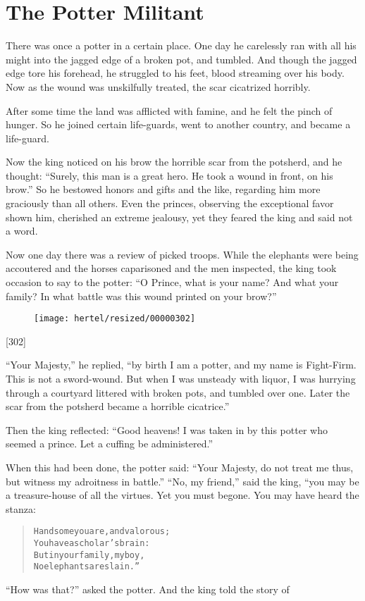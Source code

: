 \documentclass[article, twoside, 10pt]{memoir}
\renewenvironment{verbatim}{%
\begin{quote}%
\vskip -10pt%
\begin{alltt}\normalfont\small}{\end{alltt}%
\end{quote}%
\vskip -10pt
} %
\begin{document}
\chapter{The Potter Militant}

There was once a potter in a certain place. One day he carelessly
ran with all his might into the jagged edge of a broken pot, and
tumbled. And though the jagged edge tore his forehead, he struggled
to his feet, blood streaming over his body. Now as the wound was
unskilfully treated, the scar cicatrized horribly.

After some time the land was afflicted with famine, and he felt the
pinch of hunger. So he joined certain life-guards, went to another
country, and became a life-guard.

Now the king noticed on his brow the horrible scar from the
potsherd, and he thought:
``Surely, this man is a great hero. He took a wound in front, on his brow.''
So he bestowed honors and gifts and the like, regarding him more
graciously than all others. Even the princes, observing the
exceptional favor shown him, cherished an extreme jealousy, yet
they feared the king and said not a word.

Now one day there was a review of picked troops. While the
elephants were being accoutered and the horses caparisoned and the
men inspected, the king took occasion to say to the potter:
``O Prince, what is your name? And what your family? In what battle was this wound printed on your brow?''
\begin{figure}[p]\texttt{[image: hertel/resized/00000302]}\end{figure}[302]

``Your Majesty,'' he replied,
``by birth I am a potter, and my name is Fight-Firm. This is not a sword-wound. But when I was unsteady with liquor, I was hurrying through a courtyard littered with broken pots, and tumbled over one. Later the scar from the potsherd became a horrible cicatrice.''

Then the king reflected:
``Good heavens! I was taken in by this potter who seemed a prince. Let a cuffing be administered.''

When this had been done, the potter said:
``Your Majesty, do not treat me thus, but witness my adroitness in battle.''
``No, my friend,'' said the king, “you may be a treasure-house of
all the virtues. Yet you must begone. You may have heard the
stanza:

\begin{verbatim}
Handsome you are, and valorous;
    You have a scholar's brain:
But in your family, my boy,
    No elephants are slain.”
\end{verbatim}
``How was that?'' asked the potter. And the king told the story of
\end{document}
